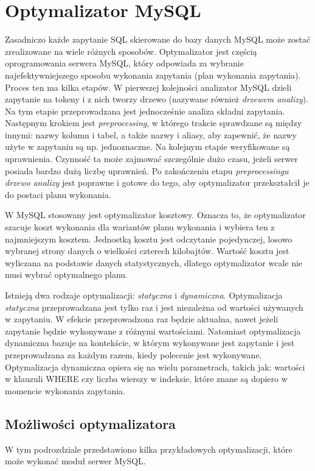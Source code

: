 \section{Optymalizator MySQL}

Zasadniczo każde zapytanie SQL skierowane do bazy danych MySQL może zostać zrealizowane na wiele różnych sposobów. Optymalizator jest częścią oprogramowania serwera MySQL, który odpowiada za wybranie najefektywniejszego sposobu wykonania zapytania (plan wykonania zapytania).
Proces ten ma kilka etapów. W pierwszej kolejności analizator MySQL dzieli zapytanie na tokeny i z nich tworzy drzewo (nazywane również \textit{drzewem analizy}). Na tym etapie przeprowadzana jest jednocześnie analiza składni zapytania. Następnym krokiem jest \textit{preprocessing}, w którego trakcie sprawdzane są między innymi: nazwy kolumn i tabel, a także nazwy i aliasy, aby zapewnić, że nazwy użyte w zapytaniu są np. jednoznaczne. Na kolejnym etapie weryfikowane są uprawnienia. Czynność ta może zajmować szczególnie dużo czasu, jeżeli serwer posiada bardzo dużą liczbę uprawnień. Po zakończeniu etapu \textit{preprocessingu} \textit{drzewo analizy} jest poprawne i gotowe do tego, aby optymalizator przekształcił je do postaci planu wykonania.

W MySQL stosowany jest optymalizator kosztowy. Oznacza to, że optymalizator szacuje koszt wykonania dla wariantów planu wykonania i wybiera ten z najmniejszym kosztem. Jednostką kosztu jest odczytanie pojedynczej, losowo wybranej strony danych o wielkości czterech kilobajtów. Wartość kosztu jest wyliczana na podstawie danych statystycznych, dlatego optymalizator wcale nie musi wybrać optymalnego planu.

Istnieją dwa rodzaje optymalizacji: \textit{statyczna} i \textit{dynamiczna}. Optymalizacja \textit{statyczna} przeprowadzana jest tylko raz i jest niezależna od wartości używanych w zapytaniu. W efekcie przeprowadzona raz będzie aktualna, nawet jeżeli zapytanie będzie wykonywane z różnymi wartościami. Natomiast optymalizacja dynamiczna bazuje na kontekście, w którym wykonywane jest zapytanie i jest przeprowadzana za każdym razem, kiedy polecenie jest wykonywane. Optymalizacja dynamiczna opiera się na wielu parametrach, takich jak: wartości w klauzuli WHERE czy liczba wierszy w indeksie, które znane są dopiero w momencie wykonania zapytania.

\subsection{Możliwości optymalizatora}
W tym podrozdziale przedstawiono kilka przykładowych optymalizacji, które może wykonać moduł serwer MySQL.

